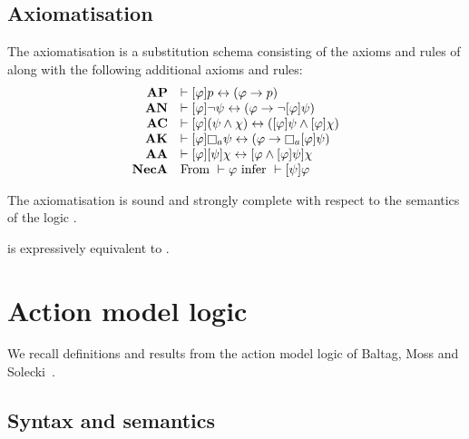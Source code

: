 \subsection{Axiomatisation}

\begin{definition}
The axiomatisation \axiomPalS{} is a substitution schema consisting of the axioms and rules of \axiomS{} along with the following additional axioms and rules:
$$
\begin{array}{rl}
    {\bf AP} & \proves \announceA{\phi} \atomP \iff (\phi \implies \atomP)\\
    {\bf AN} & \proves \announceA{\phi} \lnot \psi \iff (\phi \implies \lnot \announceA{\phi} \psi)\\
    {\bf AC} & \proves \announceA{\phi} (\psi \land \chi) \iff (\announceA{\phi} \psi \land \announceA{\phi} \chi)\\
    {\bf AK} & \proves \announceA{\phi} \necessary[\agentA] \psi \iff (\phi \implies \necessary[\agentA] \announceA{\phi} \psi)\\
    {\bf AA} & \proves \announceA{\phi} \announceA{\psi} \chi \iff \announceA{\phi \land \announceA{\phi} \psi} \chi\\
    {\bf NecA} & \text{From } \proves \phi \text{ infer } \proves \announceA{\psi} \phi
\end{array}
$$
\end{definition}

\begin{proposition}
The axiomatisation \axiomPalS{} is sound and strongly complete with respect to the semantics of the logic \logicPalS{}.
\end{proposition}

\begin{proposition}
\logicPalS{} is expressively equivalent to \logicS{}.
\end{proposition}

\section{Action model logic}

We recall definitions and results from the action model logic of Baltag, Moss and Solecki~\cite{baltagetal:1998,baltagetal:2004}.

\subsection{Syntax and semantics}

